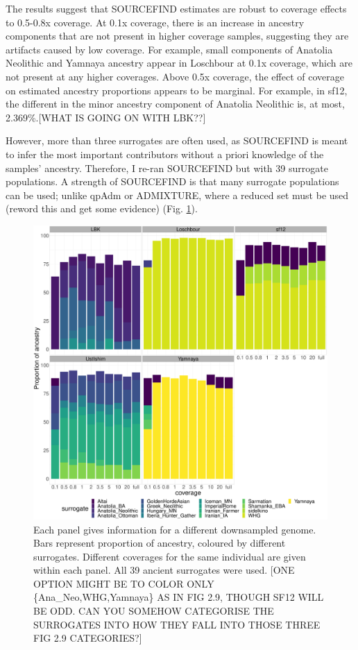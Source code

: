 The results suggest that SOURCEFIND estimates are robust to coverage effects to 0.5-0.8x coverage. At 0.1x coverage, there is an increase in ancestry components that are not present in higher coverage samples, suggesting they are artifacts caused by low coverage. For example, small components of Anatolia Neolithic and Yamnaya ancestry appear in Loschbour at 0.1x coverage, which are not present at any higher coverages. Above 0.5x coverage, the effect of coverage on estimated ancestry proportions appears to be marginal. For example, in sf12, the different in the minor ancestry component of Anatolia Neolithic is, at most, 2.369\%.{\color{red}[WHAT IS GOING ON WITH LBK??]} 

However, more than three surrogates are often used, as SOURCEFIND is meant to infer the most important contributors without a priori knowledge of the samples' ancestry. Therefore, I re-ran SOURCEFIND but with 39 surrogate populations. A strength of SOURCEFIND is that many surrogate populations can be used; unlike qpAdm or ADMIXTURE, where a reduced set must be used (reword this and get some evidence) (Fig. \ref{fig:SOURCEFIND_AllPSop_downsampled}). 

\begin{figure}[htp]
    \centering
    \includegraphics[width=1.0\textwidth]{../images/chapter1/Allpops_SF_downsampled.pdf}
    \caption{Each panel gives information for a different downsampled genome. Bars represent proportion of ancestry, coloured by different surrogates. Different coverages for the same individual are given within each panel. All 39 ancient surrogates were used. {\color{red}[ONE OPTION MIGHT BE TO COLOR ONLY \{Ana\_Neo,WHG,Yamnaya\} AS IN FIG 2.9, THOUGH SF12 WILL BE ODD. CAN YOU SOMEHOW CATEGORISE THE SURROGATES INTO HOW THEY FALL INTO THOSE THREE FIG 2.9 CATEGORIES?]}}
    \label{fig:SOURCEFIND_AllPSop_downsampled}
\end{figure}

